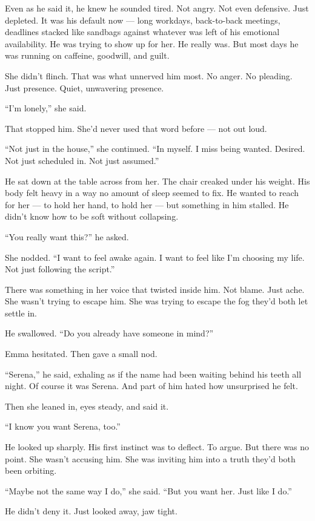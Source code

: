 Even as he said it, he knew he sounded tired. Not angry. Not even defensive. Just depleted. It was his default now — long workdays, back-to-back meetings, deadlines stacked like sandbags against whatever was left of his emotional availability. He was trying to show up for her. He really was. But most days he was running on caffeine, goodwill, and guilt.

She didn’t flinch. That was what unnerved him most. No anger. No pleading. Just presence. Quiet, unwavering presence.

“I’m lonely,” she said.

That stopped him. She’d never used that word before — not out loud.

“Not just in the house,” she continued. “In myself. I miss being wanted. Desired. Not just scheduled in. Not just assumed.”

He sat down at the table across from her. The chair creaked under his weight. 
His body felt heavy in a way no amount of sleep seemed to fix. 
He wanted to reach for her — to hold her hand, to hold her — but something in him stalled. 
He didn’t know how to be soft without collapsing.

“You really want this?” he asked.

She nodded. “I want to feel awake again. I want to feel like I’m choosing my life. Not just following the script.”

There was something in her voice that twisted inside him. Not blame. Just ache. 
She wasn’t trying to escape him. She was trying to escape the fog they’d both let settle in.

He swallowed. “Do you already have someone in mind?”

Emma hesitated. Then gave a small nod.

“Serena,” he said, exhaling as if the name had been waiting behind his teeth all night. Of course it was Serena. And part of him hated how unsurprised he felt.

Then she leaned in, eyes steady, and said it.

“I know you want Serena, too.”

He looked up sharply. His first instinct was to deflect. To argue. But there was no point. She wasn’t accusing him. She was inviting him into a truth they’d both been orbiting.

“Maybe not the same way I do,” she said. “But you want her. Just like I do.”

He didn’t deny it. Just looked away, jaw tight.

